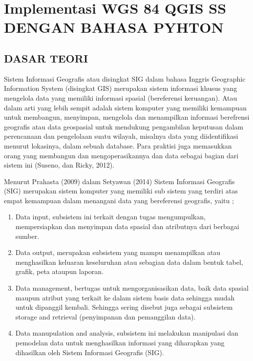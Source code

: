 \section{Implementasi WGS 84 QGIS SS DENGAN BAHASA PYHTON}
\subsection{DASAR TEORI}

Sistem Informasi Geografis atau disingkat SIG dalam bahasa Inggris Geographic Information System (disingkat GIS) merupakan sistem informasi khusus yang mengelola data yang memiliki informasi spasial (bereferensi keruangan). Atau dalam arti yang lebih sempit adalah sistem komputer yang memiliki kemampuan untuk membangun, menyimpan, mengelola dan menampilkan informasi berefrensi geografis atau data geospasial untuk mendukung pengambilan keputusan dalam perencanaan dan pengelolaan suatu wilayah, misalnya data yang diidentifikasi menurut lokasinya, dalam sebuah database. Para praktisi juga memasukkan orang yang membangun dan mengoperasikannya dan data sebagai bagian dari sistem ini (Suseno, dan Ricky, 2012).


Menurut Prahasta (2009) dalam Setyawan (2014) Sistem Informasi Geografis (SIG) merupakan sistem komputer yang memiliki sub sistem yang terdiri atas empat kemampuan dalam menangani data yang bereferensi geografis, yaitu ;
\begin{enumerate}
\item Data input, subsistem ini terkait dengan tugas mengumpulkan, mempersiapkan dan menyimpan data spasial dan atributnya dari berbagai sumber.
\item Data output, merupakan subsistem yang mampu menampilkan atau menghasilkan keluaran keseluruhan atau sebagian data dalam bentuk tabel, grafik, peta ataupun laporan.
\item Data management, bertugas untuk mengorganisasikan data, baik data spasial maupun atribut yang terkait ke dalam sistem basis data sehingga mudah untuk dipanggil kembali. Sehingga sering disebut juga sebagai subsistem storage and retrieval (penyimpanan dan pemanggilan data).
\item Data manupulation and analysis, subsistem ini melakukan manipulasi dan pemodelan data untuk menghasilkan informasi yang diharapkan yang dihasilkan oleh Sistem Informasi Geografis (SIG).
\end{enumerate}

